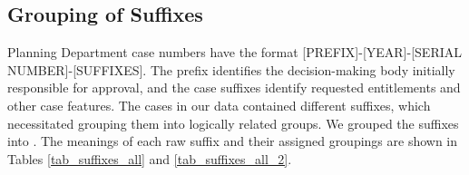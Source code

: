 \subsection{Grouping of Suffixes}

Planning Department case numbers have the format [PREFIX]-[YEAR]-[SERIAL NUMBER]-[SUFFIXES]. The prefix identifies the decision-making body initially responsible for approval, and the case suffixes identify requested entitlements and other case features. The cases in our data contained  different suffixes, which necessitated grouping them into logically related groups. We grouped the  suffixes into . The meanings of each raw suffix and their assigned groupings are shown in Tables \ref{tab_suffixes_all} and \ref{tab_suffixes_all_2}. 

